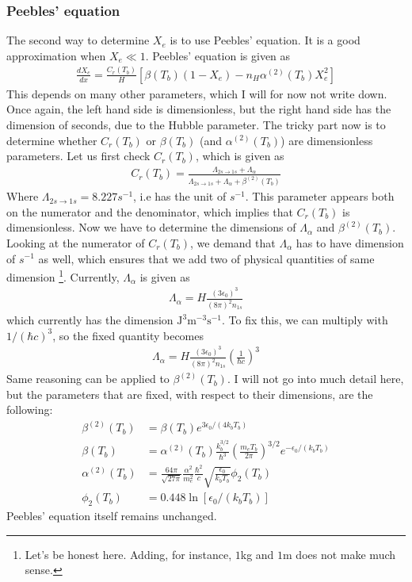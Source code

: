 \documentclass[12pt]{article}
\begin{document}
\subsubsection*{Peebles' equation}
The second way to determine $X_e$ is to use Peebles' equation. It is a good approximation when $X_e \ll 1$. Peebles' equation is given as
\begin{align}
\frac{dX_e}{dx} = \frac{C_r(T_b)}{H}\left[\beta(T_b)(1-X_e) - n_H \alpha^{(2)}(T_b)X_e^2\right]
\end{align}
This depends on many other parameters, which I will for now not write down. Once again, the left hand side is dimensionless, but the right hand side has the dimension of seconds, due to the Hubble parameter. The tricky part now is to determine whether $C_r(T_b)$ or $\beta(T_b)$ (and $\alpha^{(2)}(T_b)$) are dimensionless parameters. Let us first check $C_r(T_b)$, which is given as
\begin{align}
C_r(T_b) = \frac{\Lambda_{2s\to 1s} + \Lambda_{\alpha}}{\Lambda_{2s\to 1s}+ \Lambda_\alpha + \beta^{(2)}(T_b)}
\end{align}
Where $\Lambda_{2s\to 1s} = 8.227s^{-1}$, i.e has the unit of $s^{-1}$. This parameter appears both on the numerator and the denominator, which implies that $C_r(T_b)$ is dimensionless. Now we have to determine the dimensions of $\Lambda_\alpha$ and $\beta^{(2)}(T_b)$. Looking at the numerator of $C_r(T_b)$, we demand that $\Lambda_\alpha$ has to have dimension of $s^{-1}$ as well, which ensures that we add two of physical quantities of same dimension \footnote{Let's be honest here. Adding, for instance, $1$kg and $1$m does not make much sense.}. Currently, $\Lambda_\alpha$ is given as
\begin{align}
\Lambda_\alpha = H \frac{(3\epsilon_0)^3}{(8\pi)^2n_{1s}}
\end{align}
which currently has the dimension $\text{J}^3\text{m}^{-3}\text{s}^{-1}$. To fix this, we can multiply with $1/(\hbar c)^3$, so the fixed quantity becomes
\begin{align}
\Lambda_\alpha = H\frac{(3\epsilon_0)^3}{(8\pi)^2n_{1s}}\left(\frac{1}{\hbar c}\right)^3
\end{align}
Same reasoning can be applied to $\beta^{(2)}(T_b)$. I will not go into much detail here, but the parameters that are fixed, with respect to their dimensions, are the following:
\begin{align}
\beta^{(2)}(T_b) &= \beta(T_b)e^{3\epsilon_0/(4k_bT_b)}\\
\beta(T_b) &= \alpha^{(2)}(T_b)\frac{k_b^{3/2}}{\hbar^3}\left(\frac{m_e T_b}{2\pi} \right)^{3/2}e^{-\epsilon_0/(k_b T_b)}\\
\alpha^{(2)}(T_b) &= \frac{64\pi}{\sqrt{27\pi}}\frac{\alpha^2}{m_e^2} \frac{\hbar^2}{c} \sqrt{\frac{\epsilon_0}{k_b T_b}}\phi_2(T_b) \\
\phi_2(T_b)&= 0.448\ln[\epsilon_0/(k_b T_b)]
\end{align}
Peebles' equation itself remains unchanged.
\end{document}
